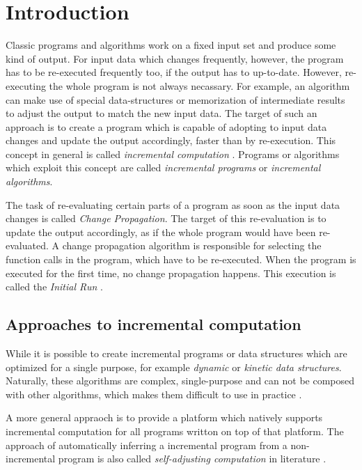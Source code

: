 \section{Introduction}
Classic programs and algorithms work on a fixed input set and produce some kind of output. For input data which changes frequently, however, the program has to be re-executed frequently too, if the output has to up-to-date. However, re-executing the whole program is not always necassary. For example, an algorithm can make use of special data-structures or memorization of intermediate results to adjust the output to match the new input data. The target of such an approach is to create a program which is capable of adopting to input data changes and update the output accordingly, faster than by re-execution. This concept in general is called \textit{incremental computation} \cite{Ramalingam:IncrementalBibliography}. Programs or algorithms which exploit this concept are called \textit{incremental programs} or \textit{incremental algorithms}. 

The task of re-evaluating certain parts of a program as soon as the input data changes is called \textit{Change Propagation}. The target of this re-evaluation is to update the output accordingly, as if the whole program would have been re-evaluated. A change propagation algorithm is responsible for selecting the function calls in the program, which have to be re-executed. When the program is executed for the first time, no change propagation happens. This execution is called the \textit{Initial Run} \cite{Acar2005thesis}.

\subsection{Approaches to incremental computation}
While it is possible to create incremental programs or data structures which are optimized for a single purpose, for example \textit{dynamic} or \textit{kinetic data structures}. Naturally, these algorithms are complex, single-purpose and can not be composed with other algorithms, which makes them difficult to use in practice \cite{Acar2005thesis}. 
 
A more general appraoch is to provide a platform which natively supports incremental computation for all programs writton on top of that platform. The approach of automatically inferring a incremental program from a non-incremental program is also called \textit{self-adjusting computation} in literature \cite{Harper2004} \cite{Acar2005thesis}. 

